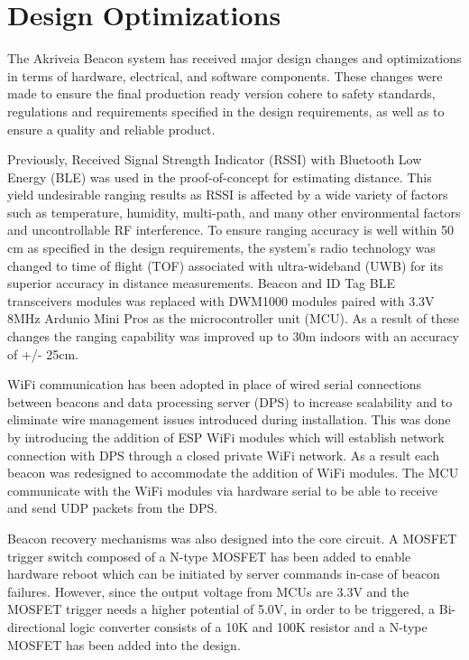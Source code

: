 

\setcounter{section}{1}
\section{Design Optimizations}

\bigskip
The Akriveia Beacon system has received major design changes and optimizations in terms of hardware, electrical, and software components. These changes were made to ensure the final production ready version cohere to safety standards, regulations  and requirements specified in the design requirements, as well as to ensure a quality and reliable product.

\bigskip
Previously, Received Signal Strength Indicator (RSSI) with Bluetooth Low Energy (BLE) was used in the proof-of-concept for estimating distance. This yield undesirable ranging results as RSSI is affected by a wide variety of factors such as temperature, humidity, multi-path, and many other environmental factors and uncontrollable RF interference. To ensure ranging accuracy is well within 50 cm as specified in the design requirements, the system's radio technology was changed to time of flight (TOF) associated with ultra-wideband (UWB) for its superior accuracy in distance measurements. Beacon and ID Tag BLE transceivers modules was replaced with DWM1000 modules paired with 3.3V 8MHz Ardunio Mini Pros as the microcontroller unit (MCU). As a result of these changes the ranging capability was improved up to 30m indoors with an accuracy of +/- 25cm. 

\bigskip
WiFi communication has been adopted in place of wired serial connections between beacons and data processing server (DPS) to increase scalability and to eliminate wire management issues introduced during installation. This was done by introducing the addition of ESP WiFi modules which will establish network connection with DPS through a closed private WiFi network. As a result each beacon was redesigned to accommodate the addition of WiFi modules. The MCU communicate with the WiFi modules via hardware serial to be able to receive and send UDP packets from the DPS.

\bigskip
Beacon recovery mechanisms was also designed into the core circuit. A MOSFET trigger switch composed of a N-type MOSFET has been added to enable hardware reboot which can be initiated by server commands in-case of beacon failures. However, since the output voltage from MCUs are 3.3V and the MOSFET trigger needs a higher potential of 5.0V, in order to be triggered, a Bi-directional logic converter consists of a 10K and 100K resistor and a N-type MOSFET has been added into the design. 

